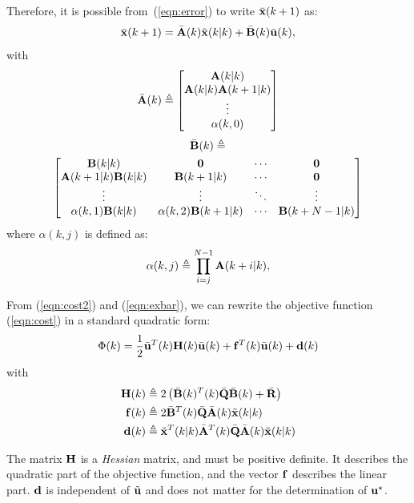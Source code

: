\documentclass[conference]{IEEEtran} %
\begin{document}
Therefore, it is possible from~(\ref{eqn:error}) to write $\bar{\bf x}(k+1)$ as:
\begin{equation}\label{eqn:exbar}
	\bar{\bf x}(k+1) = \bar{\bf A}(k)\tilde{\bf x}(k|k)+\bar{\bf B}(k)\bar{\bf u}(k),
\end{equation}
with
\begin{equation*}
	\bar{\bf A}(k) \triangleq \begin{bmatrix}
		{\bf A}(k|k) \\ {\bf A}(k|k){\bf A}(k+1|k) \\ \vdots \\ \alpha(k,0)
	\end{bmatrix}
\end{equation*}
{\small
\begin{multline*}
		\bar{\bf B}(k) \triangleq \\ \begin{bmatrix}
			{\bf B}(k|k)		       & {\bf 0} 			    	 & \cdots & {\bf 0}         \\
			{\bf A}(k+1|k){\bf B}(k|k) & {\bf B}(k+1|k)      	 & \cdots & {\bf 0}         \\
			\vdots			       & \vdots				 & \ddots & \vdots          \\
			\alpha(k,1){\bf B}(k|k)    & \alpha(k,2){\bf B}(k+1|k) & \cdots & {\bf B}(k+N-1|k)
		\end{bmatrix}
\end{multline*}
}
where  $\alpha(k,j)$ is defined as:
\begin{equation*}
	\alpha(k,j) \triangleq \prod_{i=j}^{N-1}{\bf A}(k+i|k),
\end{equation*}

From (\ref{eqn:cost2}) and (\ref{eqn:exbar}), we can rewrite the objective function (\ref{eqn:cost}) in a standard quadratic form:
\begin{equation*}
	\Phi(k) = \frac{1}{2}\bar{\bf u}^T(k){\bf H}(k)\bar{\bf u}(k) + {\bf f}^T(k)\bar{\bf u}(k) + {\bf d}(k)
\end{equation*}
with
\begin{align*}
	{\bf H}(k) &\triangleq 2\left(\bar{\bf B}(k)^T(k)\bar{\bf Q}\bar{\bf B}(k)+\bar{\bf R}\right) \\
	{\bf f}(k) &\triangleq 2\bar{\bf B}^T(k)\bar{\bf Q}\bar{\bf A}(k)\tilde{\bf x}(k|k) \\
	{\bf d}(k) &\triangleq \tilde{\bf x}^T(k|k)\bar{\bf A}^T(k)\bar{\bf Q}\bar{\bf A}(k)\tilde{\bf x}(k|k)
\end{align*}

The matrix ${\bf H}$ is a {\em Hessian} matrix, and must be positive
definite. It describes the quadratic part of the objective function, and the
vector ${\bf f}$ describes the linear part. $\bf d$ is independent of
$\tilde{\bf u}$ and does not matter for the determination of $\bf u^\star$.
\end{document}
